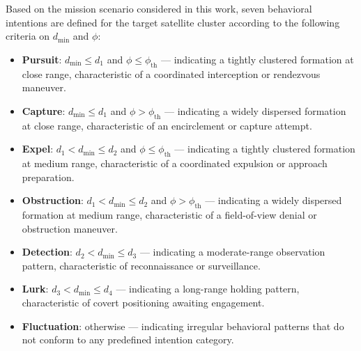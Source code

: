 \documentclass[a4paper,fleqn]{cas-dc}
\begin{document}
Based on the mission scenario considered in this work, seven behavioral intentions are defined for the target satellite cluster according to the following criteria on $d_{\min}$ and $\phi$:

\begin{itemize}
    \item \textbf{Pursuit}: $d_{\min} \leq d_1$ and $\phi \leq \phi_{\text{th}}$ --- indicating a tightly clustered formation at close range, characteristic of a coordinated interception or rendezvous maneuver.
    \item \textbf{Capture}: $d_{\min} \leq d_1$ and $\phi > \phi_{\text{th}}$ --- indicating a widely dispersed formation at close range, characteristic of an encirclement or capture attempt.
    \item \textbf{Expel}: $d_1 < d_{\min} \leq d_2$ and $\phi \leq \phi_{\text{th}}$ --- indicating a tightly clustered formation at medium range, characteristic of a coordinated expulsion or approach preparation.
    \item \textbf{Obstruction}: $d_1 < d_{\min} \leq d_2$ and $\phi > \phi_{\text{th}}$ --- indicating a widely dispersed formation at medium range, characteristic of a field-of-view denial or obstruction maneuver.
    \item \textbf{Detection}: $d_2 < d_{\min} \leq d_3$ --- indicating a moderate-range observation pattern, characteristic of reconnaissance or surveillance.
    \item \textbf{Lurk}: $d_3 < d_{\min} \leq d_4$ --- indicating a long-range holding pattern, characteristic of covert positioning awaiting engagement.
    \item \textbf{Fluctuation}: otherwise --- indicating irregular behavioral patterns that do not conform to any predefined intention category.
\end{itemize}
\end{document}

